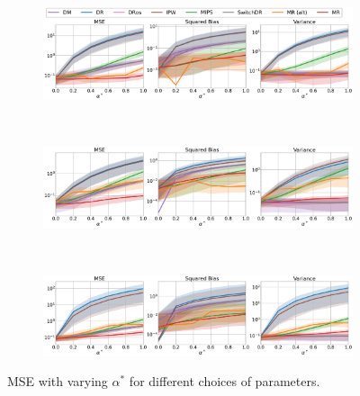 \begin{figure}[h!]
    \centering
	\begin{subfigure}{0.8\textwidth}
	    \centering
	    \includegraphics[width=1\textwidth]{figures/mr/mips_experiments/ope_vs_alphatar_dimc_100_neval_100_nac_100_ntrain_100000.png}
	    \label{subfig:d-100-na-100-neval-100-alphatar-mips}
	\end{subfigure}\\
	\begin{subfigure}{0.8\textwidth} 
	    \centering
	    \includegraphics[width=1\textwidth]{figures/mr/mips_experiments/ope_vs_alphatar_dimc_100_neval_100_nac_250_ntrain_100000.png}
	    \label{subfig:d-100-na-250-neval-100-alphatar-mips}
	\end{subfigure}\\
	\begin{subfigure}{0.8\textwidth} 
	    \centering
	    \includegraphics[width=1\textwidth]{figures/mr/mips_experiments/ope_vs_alphatar_dimc_1000_neval_100_nac_250_ntrain_100000.png}
	    \label{subfig:d-1000-na-250-neval-100-alphatar-mips}
	\end{subfigure}
    \caption{MSE with varying $\alpha^\ast$ for different choices of parameters.}
    \label{fig:mse-vs-alphatar-mips}
\end{figure}

